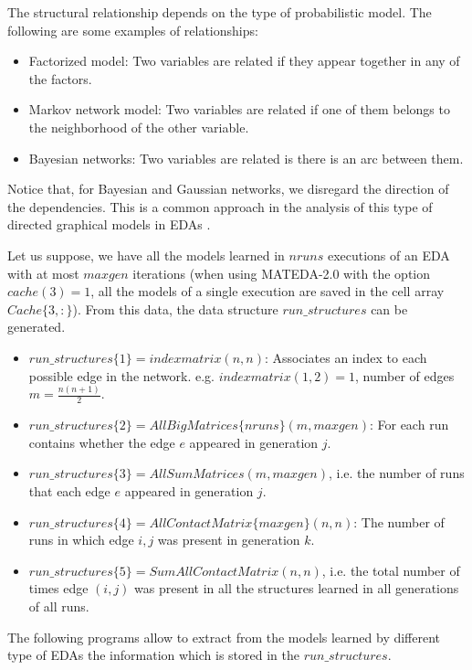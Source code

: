 \documentclass[a4paper]{article}
\begin{document}
  The structural relationship depends on the type of probabilistic
  model. The following are some examples of relationships:
  \begin{itemize}
    \item Factorized model: Two variables are related if they appear
    together in any of the factors.
    \item Markov network model: Two variables are related if one of
    them belongs to the neighborhood of the other variable.
    \item Bayesian networks: Two variables are related is there is
    an arc between them.
  \end{itemize}

 Notice that, for Bayesian and Gaussian networks,  we disregard the direction of the
 dependencies. This is a common approach in the analysis of this
 type of directed graphical models in EDAs \cite{Echegoyen_et_al:2007,Echegoyen_et_al:2008,Hauschild_and_Pelikan:2008,Hauschild_et_al:2008,Lima_et_al:2007}.

Let us suppose, we have all the models learned in $nruns$ executions of
an EDA with at most $maxgen$ iterations (when using MATEDA-2.0 with
the option $cache(3)=1$, all the models of a single execution are
saved in  the cell array $Cache\{3,:\}$). From this data, the data
structure $run\_structures$ can be  generated.

\begin{itemize}
 \item $run\_structures\{1\} = indexmatrix(n,n)$: Associates an index to each possible edge in the network.
 e.g. $indexmatrix(1,2) = 1$, number of edges $m = \frac{n(n+1)}{2}$.
 \item  $run\_structures\{2\} = AllBigMatrices\{nruns\}(m,maxgen)$:
 For each run contains whether the edge $e$ appeared in generation $j$.
 \item $run\_structures\{3\} = AllSumMatrices(m,maxgen)$, i.e. the number of runs that each edge $e$ appeared in generation
 $j$.
 \item $run\_structures\{4\} = AllContactMatrix\{maxgen\}(n,n)$: The number of runs in which edge
 $i,j$  was present in generation $k$.
 \item $run\_structures\{5\} =  SumAllContactMatrix(n,n)$, i.e. the
 total number of times edge $(i,j)$ was present in all the structures learned in all generations of all runs.
\end{itemize}

The following programs allow to extract from the models learned by
different type of EDAs the information which is stored in the
$run\_structures$.
\end{document}
